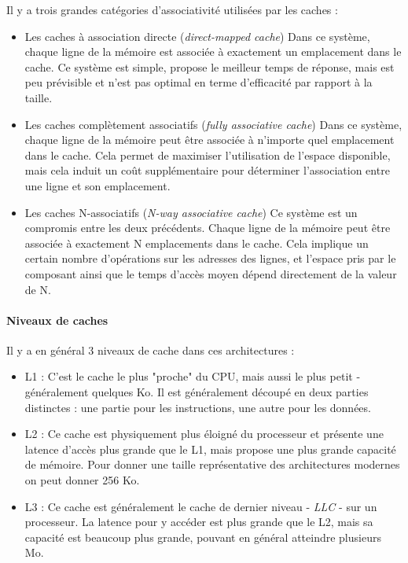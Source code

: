 Il y a trois grandes catégories d'associativité utilisées par les caches :
\begin{itemize}
  \item Les caches à association directe (\emph{direct-mapped cache})
    Dans ce système, chaque ligne de la mémoire est associée à exactement un emplacement dans le cache.
    Ce système est simple, propose le meilleur temps de réponse, mais est peu prévisible et n'est pas optimal en terme d'efficacité par rapport à la taille.
  \item Les caches complètement associatifs (\emph{fully associative cache})
    Dans ce système, chaque ligne de la mémoire peut être associée à n'importe quel emplacement dans le cache.
    Cela permet de maximiser l'utilisation de l'espace disponible, mais cela induit un coût supplémentaire pour déterminer l'association entre une ligne et son emplacement.
  \item Les caches N-associatifs (\emph{N-way associative cache})
    Ce système est un compromis entre les deux précédents.
    Chaque ligne de la mémoire peut être associée à exactement N emplacements dans le cache.
    Cela implique un certain nombre d'opérations sur les adresses des lignes, et l'espace pris par le composant ainsi que le temps d'accès moyen dépend directement de la valeur de N.
\end{itemize}

\paragraph{Niveaux de caches}

Il y a en général 3 niveaux de cache dans ces architectures :
\begin{itemize}
  \item L1 : C'est le cache le plus "proche" du CPU, mais aussi le plus petit - généralement quelques Ko. Il est généralement découpé en deux parties distinctes : une partie pour les instructions, une autre pour les données.
  \item L2 : Ce cache est physiquement plus éloigné du processeur et présente une latence d'accès plus grande que le L1, mais propose une plus grande capacité de mémoire. Pour donner une taille représentative des architectures modernes on peut donner 256 Ko.
  \item L3 : Ce cache est généralement le cache de dernier niveau - \emph{LLC} - sur un processeur. La latence pour y accéder est plus grande que le L2, mais sa capacité est beaucoup plus grande, pouvant en général atteindre plusieurs Mo.
\end{itemize}

